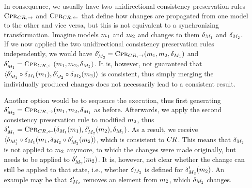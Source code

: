 In consequence, we usually have two unidirectional consistency preservation rules $\textsc{Cpr}_{CR_{},\rightarrow}$ and $\textsc{Cpr}_{CR_{},\leftarrow}$ that define how changes are propagated from one model to the other and vice versa, but this is not equivalent to a synchronizing transformation.
Imagine models $m_{1}$ and $m_{2}$ and changes to them $\delta_{M_{1}}$ and $\delta_{M_{2}}$.
If we now applied the two unidirectional consistency preservation rules independently, we would have $\delta_{M_{2}}' = \textsc{Cpr}_{CR_{},\rightarrow}(m_{1},m_{2}, \delta_{M_{1}})$ and $\delta_{M_{1}}' = \textsc{Cpr}_{CR_{},\leftarrow}(m_{1},m_{2}, \delta_{M_{2}})$.
It is, however, not guaranteed that $\langle \delta_{M_{1}}' \circ \delta_{M_{1}}(m_{1}), \delta_{M_{2}}' \circ \delta_{M_{2}}(m_{2}) \rangle$ is consistent, thus simply merging the individually produced changes does not necessarily lead to a consistent result.

Another option would be to sequence the execution, thus first generating $\delta_{M_{2}}' = \textsc{Cpr}_{CR_{},\rightarrow}(m_{1},m_{2}, \delta_{M_{1}}$ as before.
Afterwards, we apply the second consistency preservation rule to modified $m_{2}$, thus $\delta_{M_{1}}' = \textsc{Cpr}_{CR_{},\leftarrow}(\delta_{M_{1}}(m_{1}),\delta_{M_{2}}'(m_{2}), \delta_{M_{2}})$.
As a result, we receive $\langle \delta_{M_{1}'} \circ \delta_{M_{1}}(m_{1}, \delta_{M_{2}} \circ \delta_{M_{2}}'(m_{2}) \rangle$, which is consistent to $CR_{}$.
This means that $\delta_{M_{2}}$ is not applied to $m_{2}$ anymore, to which the changes were made originally, but needs to be applied to $\delta_{M_{2}}'(m_{2})$.
It is, however, not clear whether the change can still be applied to that state, i.e., whether $\delta_{M_{2}}$ is defined for $\delta_{M_{2}}'(m_{2})$.
An example may be that $\delta_{M_{2}}'$ removes an element from $m_{2}$, which $\delta_{M_{2}}$ changes.

